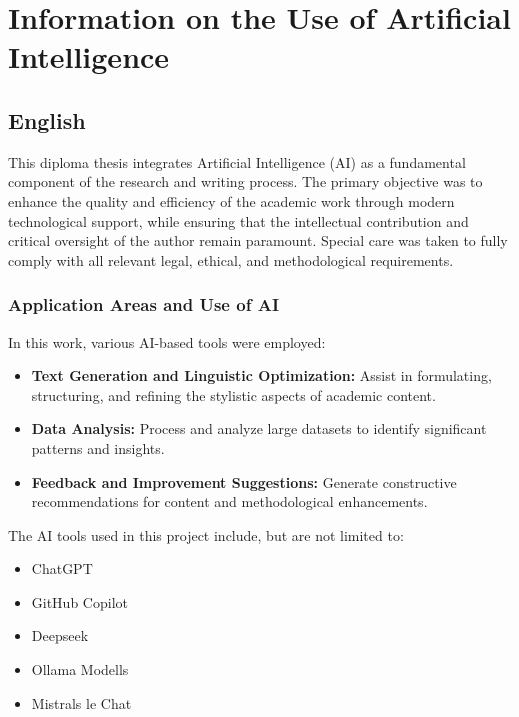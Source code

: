 \chapter{Information on the Use of Artificial Intelligence}
\label{cha:Use-of-AI}

\section*{English}

This diploma thesis integrates Artificial Intelligence (AI) as a fundamental component of the research and writing process. The primary objective was to enhance the quality and efficiency of the academic work through modern technological support, while ensuring that the intellectual contribution and critical oversight of the author remain paramount. Special care was taken to fully comply with all relevant legal, ethical, and methodological requirements.

\subsection*{Application Areas and Use of AI}
In this work, various AI-based tools were employed:
\begin{itemize}
    \item \textbf{Text Generation and Linguistic Optimization:} Assist in formulating, structuring, and refining the stylistic aspects of academic content.
    \item \textbf{Data Analysis:} Process and analyze large datasets to identify significant patterns and insights.
    \item \textbf{Feedback and Improvement Suggestions:} Generate constructive recommendations for content and methodological enhancements.
\end{itemize}
The AI tools used in this project include, but are not limited to:
\begin{itemize}
    \item ChatGPT
    \item GitHub Copilot
    \item Deepseek
    \item Ollama Modells
    \item Mistrals le Chat
\end{itemize}

